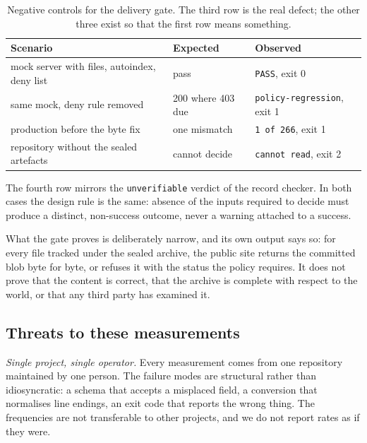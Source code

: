 \begin{table}[t]
\centering
\small
\begin{tabular}{@{}lll@{}}
\toprule
Scenario & Expected & Observed \\
\midrule
mock server with files, autoindex, deny list & pass              & \texttt{PASS}, exit 0 \\
same mock, deny rule removed                 & 200 where 403 due & \texttt{policy-regression}, exit 1 \\
production before the byte fix               & one mismatch      & \texttt{1 of 266}, exit 1 \\
repository without the sealed artefacts      & cannot decide     & \texttt{cannot read}, exit 2 \\
\bottomrule
\end{tabular}
\caption{Negative controls for the delivery gate. The third row is the real
defect; the other three exist so that the first row means something.}
\label{tab:gate-controls}
\end{table}

The fourth row mirrors the \texttt{unverifiable} verdict of the record checker.
In both cases the design rule is the same: absence of the inputs required to
decide must produce a distinct, non-success outcome, never a warning attached to
a success.

What the gate proves is deliberately narrow, and its own output says so: for
every file tracked under the sealed archive, the public site returns the
committed blob byte for byte, or refuses it with the status the policy requires.
It does not prove that the content is correct, that the archive is complete with
respect to the world, or that any third party has examined it.

\subsection{Threats to these measurements}

\emph{Single project, single operator.} Every measurement comes from one
repository maintained by one person. The failure modes are structural rather
than idiosyncratic: a schema that accepts a misplaced field, a conversion that
normalises line endings, an exit code that reports the wrong thing. The
frequencies are not transferable to other projects, and we do not report rates
as if they were.

